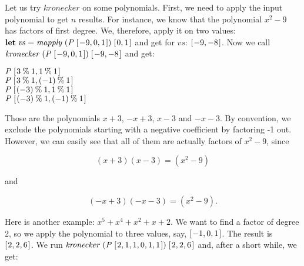 \documentclass[tikz]{scrreprt}
\newcommand{\Conid}[1]{\mathit{#1}}
\newcommand{\Varid}[1]{\mathit{#1}}
\begin{document}
Let us try \ensuremath{\Varid{kronecker}} on some polynomials.
First, we need to apply the input polynomial
to get $n$ results. For instance, we know
that the polynomial $x^2 - 9$ has factors
of first degree. We, therefore, apply it on
two values: \ensuremath{\mathbf{let}\;\Varid{vs}\mathrel{=}\Varid{mapply}\;(\Conid{P}\;[\mskip1.5mu \mathbin{-}\mathrm{9},\mathrm{0},\mathrm{1}\mskip1.5mu])\;[\mskip1.5mu \mathrm{0},\mathrm{1}\mskip1.5mu]}
and get for \ensuremath{\Varid{vs}}: \ensuremath{[\mskip1.5mu \mathbin{-}\mathrm{9},\mathbin{-}\mathrm{8}\mskip1.5mu]}.
Now we call \ensuremath{\Varid{kronecker}\;(\Conid{P}\;[\mskip1.5mu \mathbin{-}\mathrm{9},\mathrm{0},\mathrm{1}\mskip1.5mu])\;[\mskip1.5mu \mathbin{-}\mathrm{9},\mathbin{-}\mathrm{8}\mskip1.5mu]}
and get:

\ensuremath{\Conid{P}\;[\mskip1.5mu \mathrm{3}\mathbin{\%}\mathrm{1},\mathrm{1}\mathbin{\%}\mathrm{1}\mskip1.5mu]}\\
\ensuremath{\Conid{P}\;[\mskip1.5mu \mathrm{3}\mathbin{\%}\mathrm{1},(\mathbin{-}\mathrm{1})\mathbin{\%}\mathrm{1}\mskip1.5mu]}\\
\ensuremath{\Conid{P}\;[\mskip1.5mu (\mathbin{-}\mathrm{3})\mathbin{\%}\mathrm{1},\mathrm{1}\mathbin{\%}\mathrm{1}\mskip1.5mu]}\\
\ensuremath{\Conid{P}\;[\mskip1.5mu (\mathbin{-}\mathrm{3})\mathbin{\%}\mathrm{1},(\mathbin{-}\mathrm{1})\mathbin{\%}\mathrm{1}\mskip1.5mu]}

Those are the polynomials $x+3$, $-x+3$, $x-3$ and $-x-3$.
By convention, we exclude the polynomials starting with
a negative coefficient by factoring -1 out.
However, we can easily see that all of them are actually
factors of $x^2 - 9$, since

\begin{equation}
(x+3)(x-3) = (x^2-9)
\end{equation}

and

\begin{equation}
(-x+3)(-x-3) = (x^2-9).
\end{equation}

Here is another example: $x^5 + x^4 + x^2 + x + 2$.
We want to find a factor of degree 2,
so we apply the polynomial to three values, say,
\ensuremath{[\mskip1.5mu \mathbin{-}\mathrm{1},\mathrm{0},\mathrm{1}\mskip1.5mu]}. The result is \ensuremath{[\mskip1.5mu \mathrm{2},\mathrm{2},\mathrm{6}\mskip1.5mu]}.
We run \ensuremath{\Varid{kronecker}\;(\Conid{P}\;[\mskip1.5mu \mathrm{2},\mathrm{1},\mathrm{1},\mathrm{0},\mathrm{1},\mathrm{1}\mskip1.5mu])\;[\mskip1.5mu \mathrm{2},\mathrm{2},\mathrm{6}\mskip1.5mu]} 
and, after a short while, we get:
\end{document}
